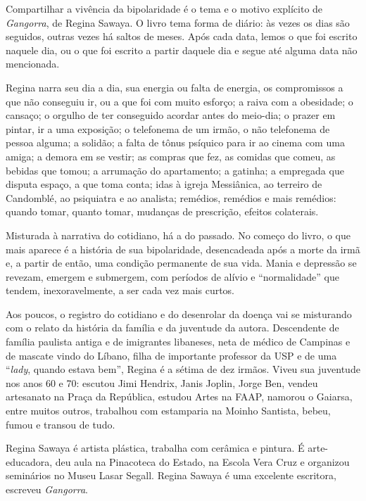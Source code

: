 
{Compartilhar a vivência da bipolaridade} é o tema e o motivo explícito
de \emph{Gangorra}{, de Regina Sawaya. O livro tema forma de diário: às
vezes os dias são seguidos, outras vezes há saltos de meses. Após cada
data, lemos o que foi escrito naquele dia, ou o que foi escrito a partir
daquele dia e segue até alguma data não mencionada.}

{Regina narra seu dia a dia, sua energia ou falta de energia, os
compromissos a que não conseguiu ir, ou a que foi com muito esforço; a
raiva com a obesidade; o cansaço; o orgulho de ter conseguido acordar
antes do meio-dia; o prazer em pintar, ir a uma exposição; o telefonema
de um irmão, o não telefonema de pessoa alguma; a solidão; a falta de
tônus psíquico para ir ao cinema com uma amiga; a demora em se vestir;
as compras que fez, as comidas que comeu, as bebidas que tomou; a
arrumação do apartamento; a gatinha; a empregada que disputa espaço, a
que toma conta; idas à igreja Messiânica, ao terreiro de Candomblé, ao
psiquiatra e ao analista; remédios, remédios e mais remédios: quando
tomar, quanto tomar, mudanças de prescrição, efeitos colaterais.}

{Misturada à narrativa do cotidiano, há a do passado. No começo do
livro, o que mais aparece é a história de sua bipolaridade, desencadeada
após a morte da irmã e, a partir de então, uma condição permanente de
sua vida. Mania e depressão se revezam, emergem e submergem, com
períodos de alívio e ``normalidade'' que tendem, inexoravelmente, a ser
cada vez mais curtos.}

{Aos poucos, o registro do cotidiano e do desenrolar da doença vai se
misturando com o relato da história da família e da juventude da autora.
Descendente de família paulista antiga e de imigrantes
libaneses, neta de médico de Campinas e de mascate vindo do Líbano,
filha de importante professor da USP e de uma ``}\emph{lady}{, quando
estava bem'', Regina é a sétima de dez irmãos. Viveu sua juventude nos
anos 60 e 70: escutou Jimi Hendrix, Janis Joplin, Jorge Ben, vendeu
artesanato na Praça da República, estudou Artes na FAAP, namorou o
Gaiarsa, entre muitos outros, trabalhou com estamparia na Moinho
Santista, bebeu, fumou e transou de tudo.}

\asterisc

Regina Sawaya é artista plástica, trabalha com cerâmica e pintura. É
arte-educadora, deu aula na Pinacoteca do Estado, na Escola Vera Cruz e
organizou seminários no Museu Lasar Segall. Regina Sawaya é uma
excelente escritora, escreveu \emph{Gangorra}.

